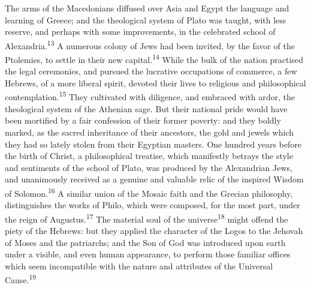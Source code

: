 
The arms of the Macedonians diffused over Asia and Egypt the
language and learning of Greece; and the theological system of
Plato was taught, with less reserve, and perhaps with some
improvements, in the celebrated school of Alexandria.\textsuperscript{13} A
numerous colony of Jews had been invited, by the favor of the
Ptolemies, to settle in their new capital.\textsuperscript{14} While the bulk of
the nation practised the legal ceremonies, and pursued the
lucrative occupations of commerce, a few Hebrews, of a more
liberal spirit, devoted their lives to religious and
philosophical contemplation.\textsuperscript{15} They cultivated with diligence,
and embraced with ardor, the theological system of the Athenian
sage. But their national pride would have been mortified by a
fair confession of their former poverty: and they boldly marked,
as the sacred inheritance of their ancestors, the gold and jewels
which they had so lately stolen from their Egyptian masters. One
hundred years before the birth of Christ, a philosophical
treatise, which manifestly betrays the style and sentiments of
the school of Plato, was produced by the Alexandrian Jews, and
unanimously received as a genuine and valuable relic of the
inspired Wisdom of Solomon.\textsuperscript{16} A similar union of the Mosaic
faith and the Grecian philosophy, distinguishes the works of
Philo, which were composed, for the most part, under the reign of
Augustus.\textsuperscript{17} The material soul of the universe\textsuperscript{18} might offend
the piety of the Hebrews: but they applied the character of the
Logos to the Jehovah of Moses and the patriarchs; and the Son of
God was introduced upon earth under a visible, and even human
appearance, to perform those familiar offices which seem
incompatible with the nature and attributes of the Universal
Cause.\textsuperscript{19}

